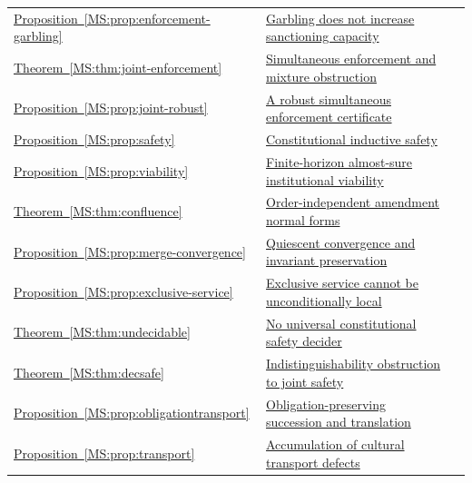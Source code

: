 \documentclass[11pt,oneside,openany]{book}
\numberwithin{equation}{section}
\begin{document}
\begin{longtable}{@{}P{.19\linewidth}P{.69\linewidth}r@{}}
\hyperref[MS:prop:enforcement-garbling]{Proposition~\ref*{MS:prop:enforcement-garbling}} & \hyperref[MS:prop:enforcement-garbling]{Garbling does not increase sanctioning capacity} & \pageref{MS:prop:enforcement-garbling}\\
\hyperref[MS:thm:joint-enforcement]{Theorem~\ref*{MS:thm:joint-enforcement}} & \hyperref[MS:thm:joint-enforcement]{Simultaneous enforcement and mixture obstruction} & \pageref{MS:thm:joint-enforcement}\\
\hyperref[MS:prop:joint-robust]{Proposition~\ref*{MS:prop:joint-robust}} & \hyperref[MS:prop:joint-robust]{A robust simultaneous enforcement certificate} & \pageref{MS:prop:joint-robust}\\
\hyperref[MS:prop:safety]{Proposition~\ref*{MS:prop:safety}} & \hyperref[MS:prop:safety]{Constitutional inductive safety} & \pageref{MS:prop:safety}\\
\hyperref[MS:prop:viability]{Proposition~\ref*{MS:prop:viability}} & \hyperref[MS:prop:viability]{Finite-horizon almost-sure institutional viability} & \pageref{MS:prop:viability}\\
\hyperref[MS:thm:confluence]{Theorem~\ref*{MS:thm:confluence}} & \hyperref[MS:thm:confluence]{Order-independent amendment normal forms} & \pageref{MS:thm:confluence}\\
\hyperref[MS:prop:merge-convergence]{Proposition~\ref*{MS:prop:merge-convergence}} & \hyperref[MS:prop:merge-convergence]{Quiescent convergence and invariant preservation} & \pageref{MS:prop:merge-convergence}\\
\hyperref[MS:prop:exclusive-service]{Proposition~\ref*{MS:prop:exclusive-service}} & \hyperref[MS:prop:exclusive-service]{Exclusive service cannot be unconditionally local} & \pageref{MS:prop:exclusive-service}\\
\hyperref[MS:thm:undecidable]{Theorem~\ref*{MS:thm:undecidable}} & \hyperref[MS:thm:undecidable]{No universal constitutional safety decider} & \pageref{MS:thm:undecidable}\\
\hyperref[MS:thm:decsafe]{Theorem~\ref*{MS:thm:decsafe}} & \hyperref[MS:thm:decsafe]{Indistinguishability obstruction to joint safety} & \pageref{MS:thm:decsafe}\\
\hyperref[MS:prop:obligationtransport]{Proposition~\ref*{MS:prop:obligationtransport}} & \hyperref[MS:prop:obligationtransport]{Obligation-preserving succession and translation} & \pageref{MS:prop:obligationtransport}\\
\hyperref[MS:prop:transport]{Proposition~\ref*{MS:prop:transport}} & \hyperref[MS:prop:transport]{Accumulation of cultural transport defects} & \pageref{MS:prop:transport}\\

\end{longtable}
\end{document}
